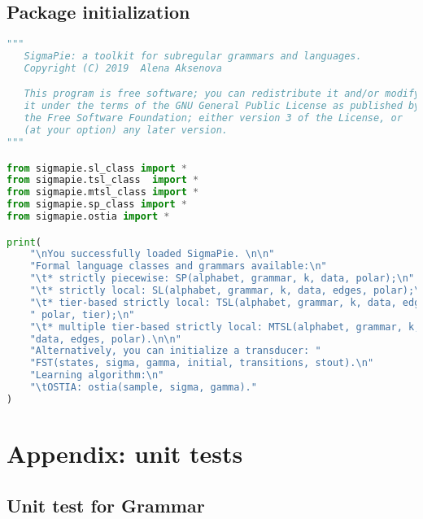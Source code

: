 \subsection*{Package initialization}

\begin{lstlisting}[language=Python]
"""
   SigmaPie: a toolkit for subregular grammars and languages.
   Copyright (C) 2019  Alena Aksenova

   This program is free software; you can redistribute it and/or modify
   it under the terms of the GNU General Public License as published by
   the Free Software Foundation; either version 3 of the License, or
   (at your option) any later version.
"""

from sigmapie.sl_class import *
from sigmapie.tsl_class  import *
from sigmapie.mtsl_class import *
from sigmapie.sp_class import *
from sigmapie.ostia import *

print(
    "\nYou successfully loaded SigmaPie. \n\n"
    "Formal language classes and grammars available:\n"
    "\t* strictly piecewise: SP(alphabet, grammar, k, data, polar);\n"
    "\t* strictly local: SL(alphabet, grammar, k, data, edges, polar);\n"
    "\t* tier-based strictly local: TSL(alphabet, grammar, k, data, edges,"
    " polar, tier);\n"
    "\t* multiple tier-based strictly local: MTSL(alphabet, grammar, k, "
    "data, edges, polar).\n\n"
    "Alternatively, you can initialize a transducer: "
    "FST(states, sigma, gamma, initial, transitions, stout).\n"
    "Learning algorithm:\n"
    "\tOSTIA: ostia(sample, sigma, gamma)."
)
\end{lstlisting}



\section*{Appendix: unit tests}

\subsection*{Unit test for Grammar}

